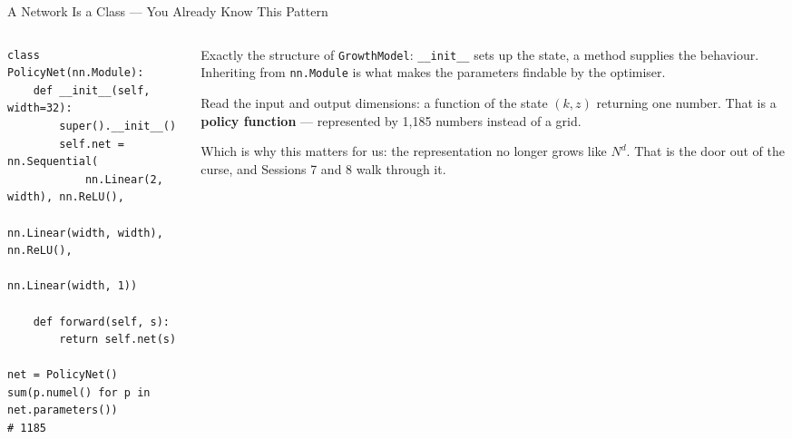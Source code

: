 \begin{frame}[fragile]{A Network Is a Class --- You Already Know This Pattern}
\begin{columns}[T]
\begin{column}{0.53\textwidth}
\begin{lstlisting}
class PolicyNet(nn.Module):
    def __init__(self, width=32):
        super().__init__()
        self.net = nn.Sequential(
            nn.Linear(2, width), nn.ReLU(),
            nn.Linear(width, width), nn.ReLU(),
            nn.Linear(width, 1))

    def forward(self, s):
        return self.net(s)

net = PolicyNet()
sum(p.numel() for p in net.parameters())
# 1185
\end{lstlisting}
\end{column}
\begin{column}{0.44\textwidth}
\small
Exactly the structure of \texttt{GrowthModel}: \texttt{\_\_init\_\_} sets up the state, a method supplies the behaviour. Inheriting from \texttt{nn.Module} is what makes the parameters findable by the optimiser.
\medskip
\begin{takeawaybox}\footnotesize
Read the input and output dimensions: a function of the state $(k,z)$ returning one number. That is a \textbf{policy function} --- represented by 1{,}185 numbers instead of a grid.
\end{takeawaybox}
\medskip
\begin{examplebox}\footnotesize
Which is why this matters for us: the representation no longer grows like $N^{d}$. That is the door out of the curse, and Sessions 7 and 8 walk through it.
\end{examplebox}
\end{column}
\end{columns}
\vspace{1mm}
\end{frame}

